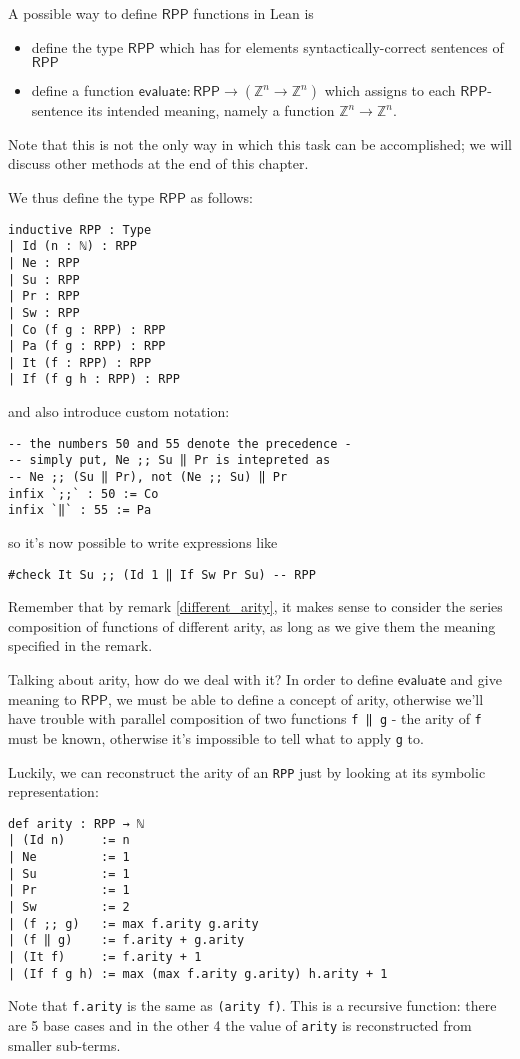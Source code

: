 \documentclass{book}
\theoremstyle{definition}
\theoremstyle{remark}
\theoremstyle{plain}
\newcommand{\Z}{\mathbb{Z}}
\newcommand{\RPP}{\mathsf{RPP}}
\begin{document}
A possible way to define $\RPP$ functions in Lean is
\begin{itemize}
\item define the type $\RPP$ which has for elements syntactically-correct sentences of $\RPP$
\item define a function $\mathsf{evaluate} : \RPP \to (\Z^n \to \Z^n)$ which assigns to each $\RPP$-sentence its intended meaning,
namely a function $\Z^n \to \Z^n$.
\end{itemize}
Note that this is not the only way in which this task can be accomplished;
we will discuss other methods at the end of this chapter.

We thus define the type $\RPP$ as follows:
\begin{lstlisting}
inductive RPP : Type
| Id (n : ℕ) : RPP
| Ne : RPP
| Su : RPP
| Pr : RPP
| Sw : RPP
| Co (f g : RPP) : RPP
| Pa (f g : RPP) : RPP
| It (f : RPP) : RPP
| If (f g h : RPP) : RPP
\end{lstlisting}
and also introduce custom notation:
\begin{lstlisting}
-- the numbers 50 and 55 denote the precedence -
-- simply put, Ne ;; Su ‖ Pr is intepreted as
-- Ne ;; (Su ‖ Pr), not (Ne ;; Su) ‖ Pr
infix `;;` : 50 := Co
infix `‖` : 55 := Pa
\end{lstlisting}
so it's now possible to write expressions like
\begin{lstlisting}
#check It Su ;; (Id 1 ‖ If Sw Pr Su) -- RPP
\end{lstlisting}
Remember that by remark \ref{different_arity}, it makes sense to consider the series composition of functions of different arity,
as long as we give them the meaning specified in the remark.

Talking about arity, how do we deal with it?
In order to define $\mathsf{evaluate}$ and give meaning to $\RPP$,
we must be able to define a concept of arity,
otherwise we'll have trouble with parallel composition of two functions \lstinline{f ‖ g} -
the arity of \lstinline{f} must be known,
otherwise it's impossible to tell what to apply \lstinline{g} to.

Luckily, we can reconstruct the arity of an \lstinline{RPP} just by looking at its symbolic representation:
\begin{lstlisting}
def arity : RPP → ℕ
| (Id n)     := n
| Ne         := 1
| Su         := 1
| Pr         := 1
| Sw         := 2
| (f ;; g)   := max f.arity g.arity
| (f ‖ g)    := f.arity + g.arity
| (It f)     := f.arity + 1
| (If f g h) := max (max f.arity g.arity) h.arity + 1
\end{lstlisting}
Note that \lstinline{f.arity} is the same as \lstinline{(arity f)}.
This is a recursive function:
there are 5 base cases and in the other 4 the value of \lstinline{arity} is reconstructed from smaller sub-terms.
\end{document}
